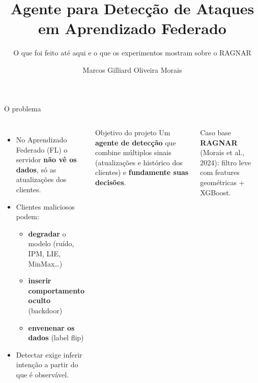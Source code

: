 \documentclass[aspectratio=169,11pt,xcolor=table]{beamer}
\title{Agente para Detecção de Ataques em Aprendizado Federado}
\subtitle{O que foi feito até aqui e o que os experimentos mostram sobre o RAGNAR}
\author{Marcos Gilliard Oliveira Morais}
\institute{H.IAAC --- Meta 3 · Setembro de 2026}
\begin{document}
\hiaactitlepage


\begin{frame}{O problema}
  \begin{columns}[T]
    \begin{itemize}
      \item No Aprendizado Federado (FL) o servidor \textbf{não vê os dados}, só as atualizações dos clientes.
      \item Clientes maliciosos podem:
      \begin{itemize}
        \item \textbf{degradar} o modelo (ruído, IPM, LIE, MinMax\dots)
        \item \textbf{inserir comportamento oculto} (backdoor)
        \item \textbf{envenenar os dados} (label flip)
      \end{itemize}
      \item Detectar exige inferir intenção a partir do que é observável.
    \end{itemize}
    \begin{block}{Objetivo do projeto}
      Um \textbf{agente de detecção} que combine múltiplos sinais (atualizações e histórico dos clientes) e \textbf{fundamente suas decisões}.
    \end{block}
    \vspace{0.3em}
    \begin{block}{Caso base}
      \textbf{RAGNAR} (Morais et al., 2024): filtro leve com features geométricas + XGBoost.
    \end{block}
  \end{columns}
\end{frame}
\end{document}
